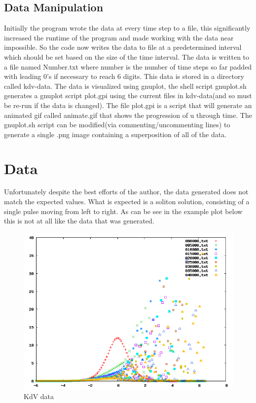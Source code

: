 \documentclass{article}
\begin{document}
\subsection{Data Manipulation}
Initially the program wrote the data at every time step to a file, this
significantly increased the runtime of the program and made working with the
data near impossible. So the code now writes the data to file at a
predetermined interval which should be set based on the size of the time
interval. The data is written to a file named {Number}.txt where number is the
number of time steps so far padded with leading 0's if necessary to reach 6
digits. This data is stored in a directory called kdv-data. The data is
visualized using gnuplot, the shell script gnuplot.sh generates a gnuplot
script plot.gpi using the current files in kdv-data(and so must be re-run if
the data is changed). The file plot.gpi is a script that will generate an
animated gif called animate.gif that shows the progression of u through time.
The gnuplot.sh script can be modified(via commenting/uncommenting lines) to
generate a single .png image containing a superposition of all of the data.
\section{Data}
Unfortunately despite the best efforts of the author, the data generated does
not match the expected values. What is expected is a soliton solution,
consisting of a single pulse moving from left to right. As can be see in the
example plot below this is not at all like the data that was generated.
\begin{figure}
  \centering
  \caption{KdV data}
  \includegraphics[scale=0.5]{data}
\end{figure}
\end{document}
